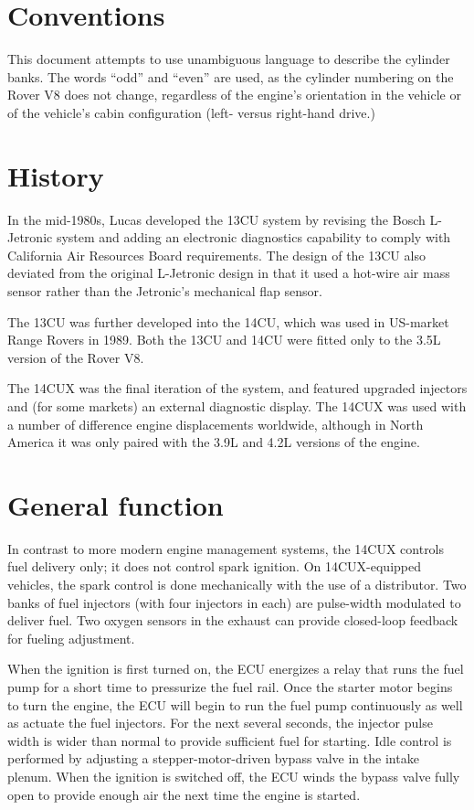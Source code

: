 \documentclass[11pt,twocolumn]{scrartcl}
\begin{document}
\section {Conventions}
This document attempts to use unambiguous language to describe the cylinder banks. The words ``odd'' and ``even'' are used, as the cylinder numbering on the Rover V8 does not change, regardless of the engine's orientation in the vehicle or of the vehicle's cabin configuration (left- versus right-hand drive.)

\section {History}
In the mid-1980s, Lucas developed the 13CU system by revising the Bosch L-Jetronic system and adding an electronic diagnostics capability to comply with California Air Resources Board requirements. The design of the 13CU also deviated from the original L-Jetronic design in that it used a hot-wire air mass sensor rather than the Jetronic's mechanical flap sensor.

The 13CU was further developed into the 14CU, which was used in US-market Range Rovers in 1989. Both the 13CU and 14CU were fitted only to the 3.5L version of the Rover V8.

The 14CUX was the final iteration of the system, and featured upgraded injectors and (for some markets) an external diagnostic display. The 14CUX was used with a number of difference engine displacements worldwide, although in North America it was only paired with the 3.9L and 4.2L versions of the engine.

\section {General function}
In contrast to more modern engine management systems, the 14CUX controls fuel delivery only; it does not control spark ignition. On 14CUX-equipped vehicles, the spark control is done mechanically with the use of a distributor. Two banks of fuel injectors (with four injectors in each) are pulse-width modulated to deliver fuel. Two oxygen sensors in the exhaust can provide closed-loop feedback for fueling adjustment.

When the ignition is first turned on, the ECU energizes a relay that runs the fuel pump for a short time to pressurize the fuel rail. Once the starter motor begins to turn the engine, the ECU will begin to run the fuel pump continuously as well as actuate the fuel injectors. For the next several seconds, the injector pulse width is wider than normal to provide sufficient fuel for starting. Idle control is performed by adjusting a stepper-motor-driven bypass valve in the intake plenum. When the ignition is switched off, the ECU winds the bypass valve fully open to provide enough air the next time the engine is started.
\end{document}
